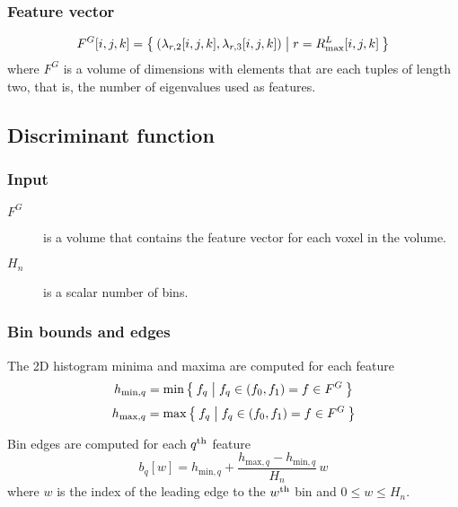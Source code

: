 \documentclass[12pt]{article}
\begin{document}
\subsubsection{Feature vector}


\begin{dmath*}
F^{G}\InputVolumeIndices = \Set{
\left(
\lambda_{r,2}\InputVolumeIndices,
\lambda_{r,3}\InputVolumeIndices
\right)
|
r = R_{\mathrm{max}}^{L}\InputVolumeIndices
}
\end{dmath*}
where \(F^{G}\) is a volume of dimensions \Dim{\InputVolume} with
elements that are each tuples of length two, that is, the number
of eigenvalues used as features.

\subsection{Discriminant function}

\subsubsection{Input}

\begin{description}
	\item[\(F^{G}\)] is a volume that contains the feature vector for each
		voxel in the volume.
	\item[\(H_n\)] is a scalar number of bins.
\end{description}

\subsubsection{Bin bounds and edges}

The 2D histogram minima and maxima are computed for each feature
\begin{dmath*}
	h_{\mathrm{min},q} = \min \Set{ f_q | f_q \in ( f_0, f_1 ) = f \in F^{G} }
\end{dmath*}
\begin{dmath*}
	h_{\mathrm{max},q} = \max \Set{ f_q | f_q \in ( f_0, f_1 ) = f \in F^{G} }
\end{dmath*}

Bin edges are computed for each \(q^{\mathrm{th}}\) feature
\begin{dmath*}
	b_q[w] =
		h_{\mathrm{min},q} +
		\frac{ h_{\mathrm{max},q}  - h_{\mathrm{min},q}  }
		     { H_n } \, w
\end{dmath*}
where \(w\) is the index of the leading edge to the
\(w^{\mathrm{th}}\) bin and \( 0 \le w \le  H_n \).
\end{document}
